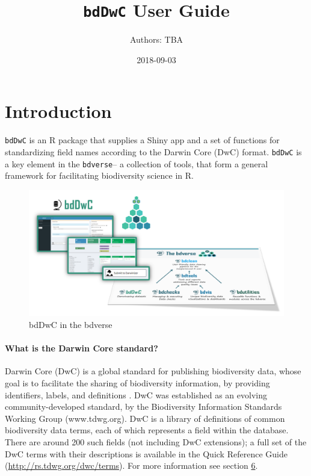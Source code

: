 \documentclass[]{book}
\title{\texttt{bdDwC} User Guide}
\author{Authors: TBA}
\date{2018-09-03}
\theoremstyle{definition}
\theoremstyle{definition}
\theoremstyle{definition}
\theoremstyle{remark}
\begin{document}
\maketitle

{
\setcounter{tocdepth}{1}
\tableofcontents
}
\chapter*{Introduction}\label{introduction}

\texttt{bdDwC} is an R package that supplies a Shiny app and a set of
functions for standardizing field names according to the Darwin Core
(DwC) format. \texttt{bdDwC} is a key element in the \texttt{bdverse}--
a collection of tools, that form a general framework for facilitating
biodiversity science in R.

\begin{figure}
\centering
\includegraphics{img/bdDwC_bdverse.png}
\caption{bdDwC in the bdverse}
\end{figure}

\subsubsection*{What is the Darwin Core
standard?}\label{what-is-the-darwin-core-standard}

Darwin Core (DwC) is a global standard for publishing biodiversity data,
whose goal is to facilitate the sharing of biodiversity information, by
providing identifiers, labels, and definitions \citep{DwC-paper}. DwC
was established as an evolving community-developed standard, by the
Biodiversity Information Standards Working Group (www.tdwg.org). DwC is
a library of definitions of common biodiversity data terms, each of
which represents a field within the database. There are around 200 such
fields (not including DwC extensions); a full set of the DwC terms with
their descriptions is available in the Quick Reference Guide
(\url{http://rs.tdwg.org/dwc/terms}). For more information see section
\protect\hyperlink{learn-more-about-darwin-core}{6}.
\end{document}
